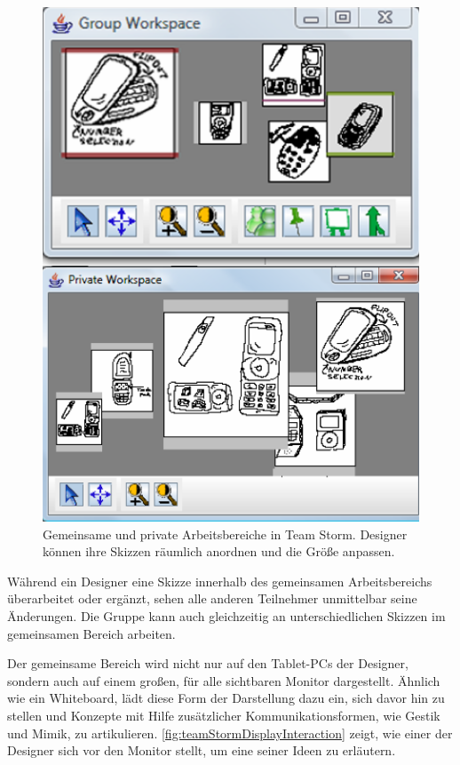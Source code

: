 \begin{figure}[bth]
	\includegraphics[width=\linewidth]{gfx/teamStormPrivateWorkspace.png}
	\caption{Gemeinsame und private Arbeitsbereiche in Team Storm. Designer können ihre Skizzen räumlich anordnen und die Größe anpassen.}
	\label{fig:teamStorm}
\end{figure}

Während ein Designer eine Skizze innerhalb des gemeinsamen Arbeitsbereichs überarbeitet oder ergänzt, sehen alle anderen Teilnehmer unmittelbar seine Änderungen. Die Gruppe kann auch gleichzeitig an unterschiedlichen Skizzen im gemeinsamen Bereich arbeiten.

Der gemeinsame Bereich wird nicht nur auf den Tablet-PCs der Designer, sondern auch auf einem großen, für alle sichtbaren Monitor dargestellt. Ähnlich wie ein Whiteboard, lädt diese Form der Darstellung dazu ein, sich davor hin zu stellen und Konzepte mit Hilfe zusätzlicher Kommunikationsformen, wie Gestik und Mimik, zu artikulieren. \autoref{fig:teamStormDisplayInteraction} zeigt, wie einer der Designer sich vor den Monitor stellt, um eine seiner Ideen zu erläutern.\\

